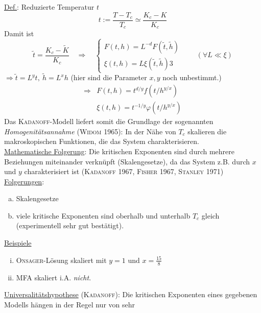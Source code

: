 \begin{enumerate}[A)]
    \underline{Def.}: Reduzierte Temperatur $t$
    \begin{equation}
        t := \frac{T-T_c}{T_c} \simeq \frac{K_c - K}{K_c}
    \end{equation}
    Damit ist
    \begin{equation}
        \tilde{t} = \frac{K_c - \tilde{K}}{K_c} \quad \Rightarrow \quad
        \begin{cases}
            F(t, h) = L^{-d} F(\tilde{t}, \tilde{h}) \\
            \xi(t, h) = L \xi (\tilde{t}, \tilde{h})3
        \end{cases}
        \qquad \left( \forall L \ll \xi \right)
    \end{equation}
    $\Rightarrow \tilde{t} = L^y t, \ \tilde{h} = L^x h$ (hier sind die Parameter $x, y$ noch unbestimmt.)
    \begin{equation}
        \begin{split}
            \Rightarrow & F(t, h) = t^{d/y} f(t/h^{y/x}) \\
            & \xi(t, h) = t^{-1/y} \varphi(t/h^{y/x})
        \end{split}
    \end{equation}
    Das \textsc{Kadanoff}-Modell liefert somit die Grundlage der sogenannten \emph{Homogenitätsannahme} (\textsc{Widom} 1965):
    In der Nähe von $T_c$ skalieren die makroskopischen Funktionen, die das System charakterisieren. \\
    \underline{Mathematische Folgerung}: Die kritischen Exponenten sind durch mehrere Beziehungen miteinander verknüpft (Skalengesetze), da das
    System z.B. durch $x$ und $y$ charakterisiert ist (\textsc{Kadanoff} 1967, \textsc{Fisher} 1967, \textsc{Stanley} 1971) \\
    \underline{Folgerungen}:
    \begin{enumerate}[a)]
        \item Skalengesetze
        \item viele kritische Exponenten sind oberhalb und unterhalb $T_c$ gleich (experimentell sehr gut bestätigt).
    \end{enumerate}
    \underline{Beispiele}
    \begin{enumerate}[i)]
        \item \textsc{Onsager}-Lösung skaliert mit $y=1$ und $x=\frac{15}{8}$
        \item MFA skaliert i.A. \emph{nicht}.
    \end{enumerate}
    \underline{Universalitätshypothese} (\textsc{Kadanoff}): Die kritischen Exponenten eines gegebenen Modells hängen in der Regel nur von sehr 

\end{enumerate}
